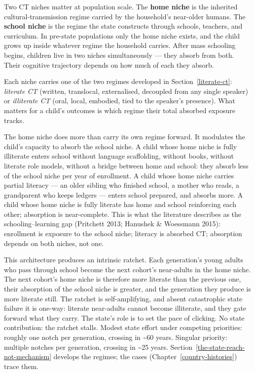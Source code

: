 \documentclass[12pt,letterpaper]{article}
\begin{document}
Two CT niches matter at population scale. The \textbf{home niche} is
the inherited cultural-transmission regime carried by the household's
near-older humans. The \textbf{school niche} is the regime the state
constructs through schools, teachers, and curriculum. In pre-state
populations only the home niche exists, and the child grows up inside
whatever regime the household carries. After mass schooling begins,
children live in two niches simultaneously --- they absorb from both.
Their cognitive trajectory depends on how much of each they absorb.

Each niche carries one of the two regimes developed in
Section~\ref{literate-ct}: \emph{literate CT} (written, translocal,
externalised, decoupled from any single speaker) or \emph{illiterate
CT} (oral, local, embodied, tied to the speaker's presence). What
matters for a child's outcomes is which regime their total absorbed
exposure tracks.

The home niche does more than carry its own regime forward. It
modulates the child's capacity to absorb the school niche. A child
whose home niche is fully illiterate enters school without language
scaffolding, without books, without literate role models, without a
bridge between home and school: they absorb less of the school niche
per year of enrollment. A child whose home niche carries partial
literacy --- an older sibling who finished school, a mother who reads,
a grandparent who keeps ledgers --- enters school prepared, and
absorbs more. A child whose home niche is fully literate has home and
school reinforcing each other; absorption is near-complete. This is
what the literature describes as the schooling--learning gap
(Pritchett 2013; Hanushek \& Woessmann 2015): enrollment is exposure
to the school niche; literacy is absorbed CT; absorption depends on
both niches, not one.

This architecture produces an intrinsic ratchet. Each generation's
young adults who pass through school become the next cohort's
near-adults in the home niche. The next cohort's home niche is
therefore more literate than the previous one, their
absorption of the school niche is greater, and the generation they
produce is more literate still. The ratchet is self-amplifying, and
absent catastrophic state failure it is one-way: literate near-adults
cannot become illiterate, and they gate forward what they carry. The
state's role is to set the pace of clicking. No state contribution:
the ratchet stalls. Modest state effort under competing priorities:
roughly one notch per generation, crossing in \textasciitilde 60
years. Singular priority: multiple notches per generation, crossing
in \textasciitilde 25 years. Section~\ref{the-state-reach-not-mechanism}
develops the regimes; the cases (Chapter~\ref{country-histories}) trace
them.
\end{document}

